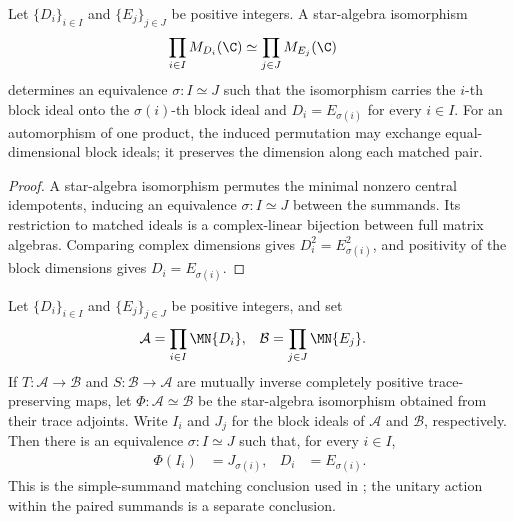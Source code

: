 \begin{theorem}\label{thm:dim_preserved}
    \leanok
    Let $\{D_i\}_{i\in I}$ and $\{E_j\}_{j\in J}$ be positive integers.
    A star-algebra isomorphism
    \begin{align}
        \prod_{i\in I} M_{D_i}(\C)
         & \simeq \prod_{j\in J} M_{E_j}(\C)
        \notag
    \end{align}
    determines an equivalence $\sigma:I\simeq J$ such that the isomorphism
    carries the $i$-th block ideal onto the $\sigma(i)$-th block ideal and
    $D_i=E_{\sigma(i)}$ for every $i\in I$. For an automorphism of one product,
    the induced permutation may exchange equal-dimensional block ideals; it
    preserves the dimension along each matched pair.
\end{theorem}

\begin{proof}\leanok
    A star-algebra isomorphism permutes the minimal nonzero central
    idempotents, inducing an equivalence $\sigma:I\simeq J$ between the
    summands. Its restriction to matched ideals is a complex-linear bijection
    between full matrix algebras. Comparing complex dimensions gives
    $D_i^2=E_{\sigma(i)}^2$, and positivity of the block dimensions gives
    $D_i=E_{\sigma(i)}$.
\end{proof}

\begin{theorem}%
    \label{thm:direct_sum_inverse_cptp_block_matching}
    \leanok
    Let $\{D_i\}_{i\in I}$ and $\{E_j\}_{j\in J}$ be positive integers, and
    set
    \begin{align}
        \mathcal A
         & =\prod_{i\in I}\MN{D_i},
         &
        \mathcal B
         & =\prod_{j\in J}\MN{E_j}.
        \notag
    \end{align}
    If $T:\mathcal A\to\mathcal B$ and
    $S:\mathcal B\to\mathcal A$ are mutually inverse completely positive
    trace-preserving maps, let $\Phi:\mathcal A\simeq\mathcal B$ be the
    star-algebra isomorphism obtained from their trace adjoints. Write $I_i$
    and $J_j$ for the block ideals of $\mathcal A$ and $\mathcal B$,
    respectively. Then there is an equivalence $\sigma:I\simeq J$ such that,
    for every $i\in I$,
    \begin{align}
        \Phi(I_i)
         & =J_{\sigma(i)},
         &
        D_i
         & =E_{\sigma(i)}.
        \label{eq:spectral_ds_block_matching}
    \end{align}
    This is the simple-summand matching conclusion used in
    \cite[Appendix~C.4, line~1997]{Cirac2016MPDO_arXiv}; the unitary action
    within the paired summands is a separate conclusion.
\end{theorem}

